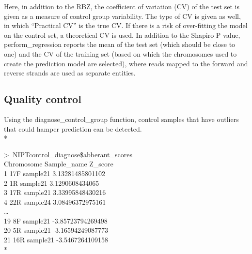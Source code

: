 Here, in addition to the RBZ, the coefficient of variation (CV) of the test set is given as a measure of control group variability. 
The type of CV is given as well, in which “Practical CV” is the true CV. If there is a risk of over-fitting the model on the control set, a theoretical CV is used. 
In addition to the Shapiro P value, perform\_regression reports the mean of the test set (which should be close to one) and the CV of the training set (based on which the chromosomes used to create the prediction model are selected), where reads mapped to the forward and reverse strands are used as separate entities.

\subsection{Quality control}
Using the diagnose\_control\_group function, control samples that have outliers that could hamper prediction can be detected. \\*


\selectfont %
\footnotesize %
\noindent\textgreater\ NIPTcontrol\_diagnose\$abberant\_scores \medskip\\
\indent Chromosome \hspace{0mm} Sample\_name \hspace{0mm} Z\_score \\
1 \hspace{1mm} 17F \hspace{11mm} sample21 \hspace{4mm} 3.13281485801102 \\
2 \hspace{1mm} 1R  \hspace{13mm} sample21 \hspace{4mm} 3.1290608434065 \\
3 \hspace{1mm} 17R \hspace{11mm} sample21 \hspace{4mm} 3.33995848430216 \\
4 \hspace{1mm} 22R \hspace{11mm} sample24 \hspace{4mm} 3.08496372975161 \\
… \\
19 \hspace{1mm}8F \hspace{13mm}  sample21 \hspace{4mm} -3.85723794269498 \\
20 \hspace{1mm}5R \hspace{13mm}  sample21 \hspace{4mm} -3.16594249087773 \\
21 \hspace{1mm}16R\hspace{13mm}  sample21 \hspace{4mm} -3.5467264109158 \\*
\selectfont %
\normalsize %



